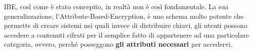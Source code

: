 \begin{note}
IBE, così come è stato concepito, in realtà non è così fondamentale. La sua generalizzazione, l'Attribute-Based-Encryption, è uno schema molto potente che permette di creare sistemi nei quali invece di distribuire chiavi, gli utenti possono accedere a contenuti cifrati per il semplice fatto di appartenere ad una particolare categoria, ovvero, perché posseggono \textbf{gli attributi necessari} per accedervi.
\end{note}
